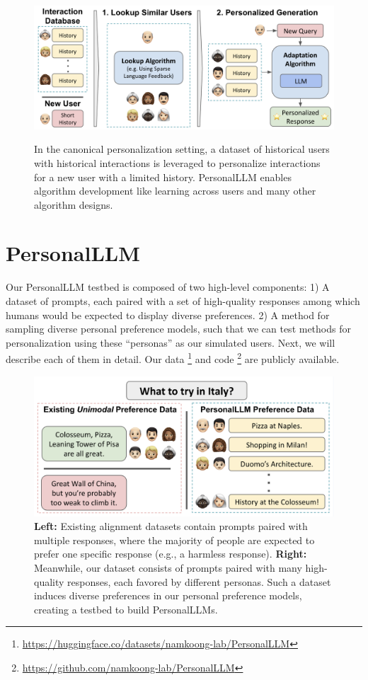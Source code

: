 \begin{figure}[t]
    \centering
\textbf{}    \includegraphics[width = \textwidth]{../figures/metalearn_fig.png}
    \caption{In the canonical personalization setting, a dataset of historical users with historical interactions is leveraged to personalize interactions for a new user with a limited history. \textsf{PersonalLLM} enables algorithm development like learning across users and many other algorithm designs.}
    \label{fig:metalearn}
\end{figure}

\section{PersonalLLM}\label{sec:dataset}

Our \textsf{PersonalLLM} testbed is composed of two high-level components:
1) A dataset of prompts, each paired with a set of high-quality responses among which humans would be expected to display diverse preferences. 
2) A method for sampling diverse personal preference models, such that we can test methods for personalization using these ``personas'' as our simulated users.
Next, we will describe each of them in detail.  Our data \footnote{\url{https://huggingface.co/datasets/namkoong-lab/PersonalLLM}} and code \footnote{\url{https://github.com/namkoong-lab/PersonalLLM}} are publicly available.

\begin{figure}[t]
    \centering
    \includegraphics[width = \textwidth]{../figures/data_example.png}
    \caption{\textbf{Left:} Existing alignment datasets contain prompts paired with multiple responses, where the majority of people are expected to prefer one specific response (e.g., a harmless response). \textbf{Right:} Meanwhile, our dataset consists of prompts paired with many high-quality responses, each favored by different personas. Such a dataset induces diverse preferences in our personal preference models, creating a testbed to build \textsf{PersonalLLM}s.}
    \label{fig:PersonalLLM}
\end{figure}

